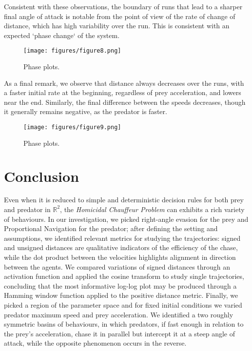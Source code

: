 \documentclass[11pt]{article}
\begin{document}
              Consistent with these observations, the boundary of runs that lead to a sharper final angle of attack is notable from the point of view of the rate of change of distance, which has high variability over the run. This is consistent with an expected `phase change` of the system.

              \begin{figure}[htbp]
                \centering
                \texttt{[image: figures/figure8.png]}
                \caption{Phase plots.}
                \label{fig:phaseplot3}
              \end{figure}

              As a final remark, we observe that distance always decreases over the runs, with a faster initial rate at the beginning, regardless of prey acceleration, and lowers near the end. Similarly, the final difference between the speeds decreases, though it generally remains negative, as the predator is faster.

              \begin{figure}[htbp]
                \centering
                \texttt{[image: figures/figure9.png]}
                \caption{Phase plots.}
                \label{fig:phaseplot4}
              \end{figure}

              \hfil
              \section{Conclusion}
              Even when it is reduced to simple and deterministic decision rules for both prey and predator in $\mathbb{R}^2$, the \textit{Homicidal Chauffeur Problem} can exhibits a rich variety of behaviours. In our investigation, we picked right-angle evasion for the prey and Proportional Navigation for the predator; after defining the setting and assumptions, we identified relevant metrics for studying the trajectories: signed and unsigned distances are qualitative indicators of the efficiency of the chase, while the dot product between the velocities highlights alignment in direction between the agents. We compared variations of signed distances through an activation function and applied the cosine transform to study single trajectories, concluding that the most informative log-log plot may be produced through a Hamming window function applied to the positive distance metric. Finally, we picked a region of the parameter space and for fixed initial conditions we varied predator maximum speed and prey acceleration. We identified a two roughly symmetric basins of behaviours, in which predators, if fast enough in relation to the prey's acceleration, chase it in parallel but intercept it at a steep angle of attack, while the opposite phenomenon occurs in the reverse.
\end{document}
